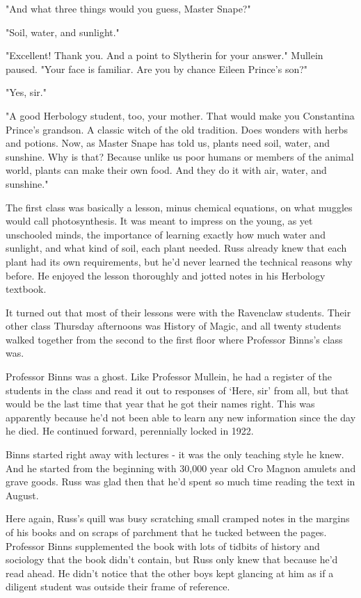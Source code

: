 "And what three things would you guess, Master Snape?"

"Soil, water, and sunlight."

"Excellent! Thank you. And a point to Slytherin for your answer." Mullein paused. "Your face is familiar. Are you by chance Eileen Prince's son?"

"Yes, sir."

"A good Herbology student, too, your mother. That would make you Constantina Prince's grandson. A classic witch of the old tradition. Does wonders with herbs and potions. Now, as Master Snape has told us, plants need soil, water, and sunshine. Why is that? Because unlike us poor humans or members of the animal world, plants can make their own food. And they do it with air, water, and sunshine."

The first class was basically a lesson, minus chemical equations, on what muggles would call photosynthesis. It was meant to impress on the young, as yet unschooled minds, the importance of learning exactly how much water and sunlight, and what kind of soil, each plant needed. Russ already knew that each plant had its own requirements, but he'd never learned the technical reasons why before. He enjoyed the lesson thoroughly and jotted notes in his Herbology textbook.

It turned out that most of their lessons were with the Ravenclaw students. Their other class Thursday afternoons was History of Magic, and all twenty students walked together from the second to the first floor where Professor Binns's class was.

Professor Binns was a ghost. Like Professor Mullein, he had a register of the students in the class and read it out to responses of `Here, sir' from all, but that would be the last time that year that he got their names right. This was apparently because he'd not been able to learn any new information since the day he died. He continued forward, perennially locked in 1922.

Binns started right away with lectures - it was the only teaching style he knew. And he started from the beginning with 30,000 year old Cro Magnon amulets and grave goods. Russ was glad then that he'd spent so much time reading the text in August.

Here again, Russ's quill was busy scratching small cramped notes in the margins of his books and on scraps of parchment that he tucked between the pages. Professor Binns supplemented the book with lots of tidbits of history and sociology that the book didn't contain, but Russ only knew that because he'd read ahead. He didn't notice that the other boys kept glancing at him as if a diligent student was outside their frame of reference.

